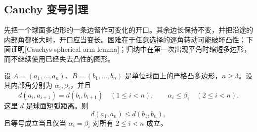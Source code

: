 \subsection{Cauchy 变号引理}
\label{g1:subsec:E04:03}

先把一个球面多边形的一条边留作可变化的开口。其余边长保持不变，并把沿途的内部角都张大时，开口应当变长。困难在于任意选择的逐角转动可能破坏凸性；下面证明[Cauchy\textquotesingle s spherical arm lemma]；归纳中在第一次出现平角时缩短多边形，而不继续使用已经失去凸性的图形。

\begin{lemma}[球面臂引理]\label{g1:lem:spherical-cauchy-arm}
	设 \(A=(a_1,\ldots,a_n)\)、\(B=(b_1,\ldots,b_n)\) 是单位球面上的严格凸多边形，\(n\ge3\)。设其内部角分别为 \(\alpha_i,\beta_i\)，并且
	\[
		d(a_i,a_{i+1})=d(b_i,b_{i+1})\quad(1\le i<n),\qquad
		\alpha_i\le\beta_i\quad(2\le i<n).
	\]
	这里 \(d\) 是球面短弧距离。则
	\[
		d(a_1,a_n)\le d(b_1,b_n),
	\]
	且等号成立当且仅当 \(\alpha_i=\beta_i\) 对所有 \(2\le i<n\) 成立。
\end{lemma}
